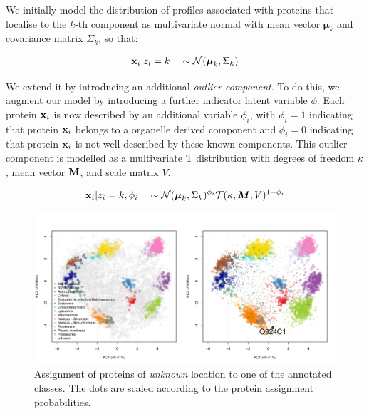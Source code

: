 \documentclass{beamer}
\theoremstyle{example}
\begin{document}
\begin{frame}{}

    We initially model the distribution of profiles associated with
    proteins that localise to the $k$-th component as multivariate
    normal with mean vector $\boldsymbol{\mu}_k$ and covariance matrix
    $\Sigma_k$, so that:

    \begin{align}
      {\bf x}_i | z_i = k \quad \sim \mathcal{N}(\boldsymbol{\mu}_k, \Sigma_k) \label{equation::preq}
    \end{align}

    \pause

    We extend it by introducing an additional \textit{outlier
      component}. To do this, we augment our model by introducing a
    further indicator latent variable $\phi$. Each protein ${\bf x}_i$
    is now described by an additional variable $\phi_i$, with $\phi_i
    = 1$ indicating that protein ${\bf x}_i$ belongs to a organelle
    derived component and $\phi_i = 0$ indicating that protein ${\bf
      x}_i$ is not well described by these known components. This
    outlier component is modelled as a multivariate T distribution
    with degrees of freedom $\kappa$, mean vector $\bf{M}$, and scale
    matrix $V$.

    \begin{align}
      {\bf x}_i | z_i = k, \phi_i \quad \sim \mathcal{N}(\boldsymbol{\mu}_k, \Sigma_k)^{\phi_i}\mathcal{T}(\kappa, \boldsymbol{M}, V)^{1 - \phi_i }
    \end{align}


\end{frame}


\begin{frame}{}
      \begin{figure}
        \includegraphics[width=1\linewidth]{./figs/tagm_pca_res.pdf}
        \caption{Assignment of proteins of
          \textit{unknown} location to one of the annotated
          classes. The dots are scaled according to the protein
          assignment probabilities.}
      \end{figure}
\end{frame}
\end{document}
